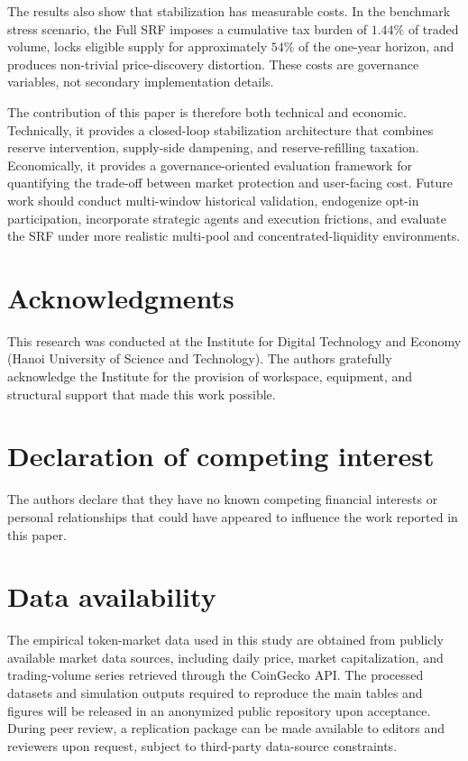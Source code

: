 \documentclass[a4paper,fleqn]{cas-dc}
\begin{document}
The results also show that stabilization has measurable costs. In the benchmark stress scenario, the Full SRF imposes a cumulative tax burden of \(1.44\%\) of traded volume, locks eligible supply for approximately \(54\%\) of the one-year horizon, and produces non-trivial price-discovery distortion. These costs are governance variables, not secondary implementation details.

The contribution of this paper is therefore both technical and economic. Technically, it provides a closed-loop stabilization architecture that combines reserve intervention, supply-side dampening, and reserve-refilling taxation. Economically, it provides a governance-oriented evaluation framework for quantifying the trade-off between market protection and user-facing cost. Future work should conduct multi-window historical validation, endogenize opt-in participation, incorporate strategic agents and execution frictions, and evaluate the SRF under more realistic multi-pool and concentrated-liquidity environments.

\section*{Acknowledgments}
This research was conducted at the Institute for Digital Technology and Economy (Hanoi University of Science and
Technology). The authors gratefully acknowledge the Institute for the provision of workspace, equipment, and structural
support that made this work possible.

\section*{Declaration of competing interest}

The authors declare that they have no known competing financial interests or personal relationships that could have appeared to influence the work reported in this paper.

\section*{Data availability}

The empirical token-market data used in this study are obtained from publicly available market data sources, including daily price, market capitalization, and trading-volume series retrieved through the CoinGecko API. The processed datasets and simulation outputs required to reproduce the main tables and figures will be released in an anonymized public repository upon acceptance. During peer review, a replication package can be made available to editors and reviewers upon request, subject to third-party data-source constraints.
\end{document}
